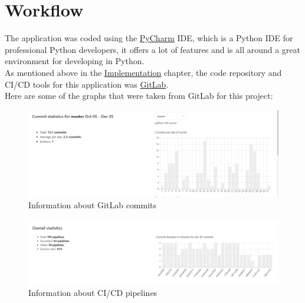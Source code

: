 \section{Workflow}
The application was coded using the \href{https://www.jetbrains.com/pycharm/}{PyCharm} IDE, which is a Python IDE for professional Python developers, it offers a lot of features and is all around a great environment for developing in Python.\\
As mentioned above in the \hyperref[sec:GitLab]{Implementation} chapter, the code repository and CI/CD tools for this application was \href{https://gitlab.com/}{GitLab}.\\
Here are some of the graphs that were taken from GitLab for this project:
\begin{figure}[H]
	\includegraphics[width=\linewidth]{./Images/Appendices/commits_graph.png}
	\caption{Information about GitLab commits}
\end{figure}
\begin{figure}[H]
	\includegraphics[width=\linewidth]{./Images/Appendices/pipelines_graph.png}
	\caption{Information about CI/CD pipelines}
\end{figure}